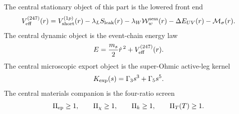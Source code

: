 The central stationary object of this part is the lowered front end
\begin{equation}
\label{eq:app-part08-intro-veff230}
V_{\rm eff}^{(247)}(r)
=
V_{\rm short}^{(1p)}(r)
-
\lambda_L S_{\rm leak}(r)
-
\lambda_W\mathcal W_w^{\rm sess}(r)
-
\Delta E_{UV}(r)
-
\mathcal M_{\sigma}(r).
\end{equation}
The central dynamic object is the event-chain energy law
\begin{equation}
\label{eq:app-part08-intro-event-energy}
E=\frac{m_s}{2}\dot r^{\,2}+V_{\rm eff}^{(247)}(r).
\end{equation}
The central microscopic export object is the super-Ohmic active-leg kernel
\begin{equation}
\label{eq:app-part08-intro-export-kernel}
K_{\rm exp}(s)=\Gamma_3s^3+\Gamma_5s^5.
\end{equation}
The central materials companion is the four-ratio screen
\begin{equation}
\label{eq:app-part08-intro-material-screen}
\Pi_{\rm ep}\ge 1,
\qquad
\Pi_{\chi}\ge 1,
\qquad
\Pi_k\ge 1,
\qquad
\Pi_T(T)\ge 1.
\end{equation}

